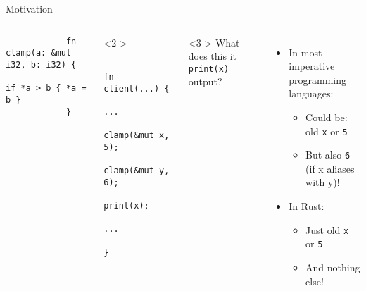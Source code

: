 \documentclass{sdqbeamer}
\newcommand{\code}[1]{\texttt{#1}}
\begin{document}
\begin{frame}[fragile]{Motivation}{}
	\begin{columns}
		\begin{verbatim}
			fn  clamp(a: &mut i32, b: i32) {
				if *a > b { *a = b }
			}
		\end{verbatim}
		\begin{onlyenv}<2->
			\begin{verbatim}
				fn  client(...) {
					...
					clamp(&mut x, 5);
					clamp(&mut y, 6);
					print(x);
					...
				}
			\end{verbatim}
		\end{onlyenv}

		<3->
		What does this it \code{print(x)} output?
		\begin{itemize}
			\item In most imperative programming languages:
			\begin{itemize}
				\item Could be: old \code{x} or \code{5}
				\item<4-> But also \code{6} (if x aliases with y)!
			\end{itemize}
			\item<5-> In Rust:
				\begin{itemize}
					\item Just old \code{x} or \code{5}
					\item And nothing else!
				\end{itemize}
		\end{itemize}
		
	\end{columns}
\end{frame}
\end{document}
